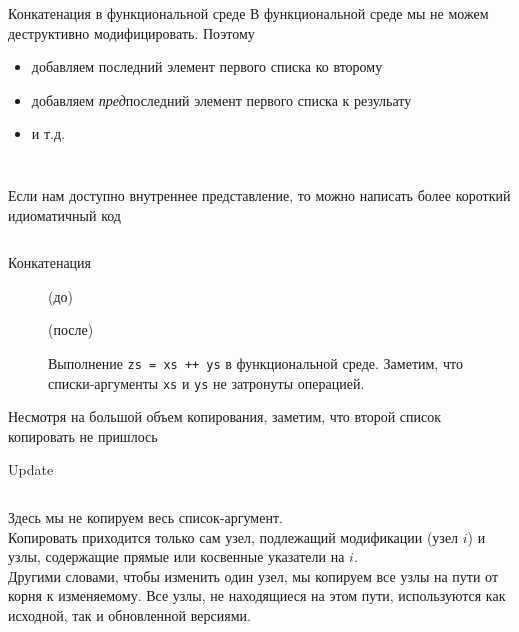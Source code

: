 \begin{frame}[fragile]{Конкатенация в функциональной среде}
В функциональной среде мы не можем деструктивно модифицировать. Поэтому
\begin{itemize}
\item добавляем последний элемент первого списка ко второму
\item добавляем \emph{пред}последний элемент первого списка к резульату
\item и т.д.
\end{itemize}

\inputminted[firstline=43,lastline=47] {haskell}{code/Stacks.hs}
\end{frame}

\begin{frame}[fragile]{}
\inputminted[firstline=43,lastline=47] {haskell}{code/Stacks.hs}
Если нам доступно внутреннее представление, то можно написать более короткий идиоматичный код
\inputminted[firstline=50,lastline=51] {haskell}{code/Stacks.hs}
\end{frame}

\begin{frame}[fragile]{Конкатенация}
\begin{figure}[h]
	\centering
	\par
	(до)\par
	\vspace{0.5cm}
	\par
	(после)\par
	\vspace{0.5cm}
	\caption{Выполнение \texttt{zs = xs ++ ys} в функциональной среде. Заметим, что списки-аргументы \texttt{xs} и \texttt{ys} не затронуты операцией.
	}
	\label{fig:2.5}
\end{figure}
Несмотря на большой объем копирования, заметим, что второй список копировать не пришлось
\end{frame}

\begin{frame}[fragile]{Update}
\inputminted[firstline=61,lastline=64] {haskell}{code/Stacks.hs}
Здесь мы не копируем весь список-аргумент.\\

Копировать приходится
только сам узел, подлежащий модификации (узел $i$) и узлы,
содержащие прямые или косвенные указатели на $i$. \\

Другими словами,
чтобы изменить один узел, мы копируем все узлы на пути от корня
к изменяемому. Все узлы, не находящиеся на этом пути, используются как
исходной, так и обновленной версиями. 
\end{frame}

